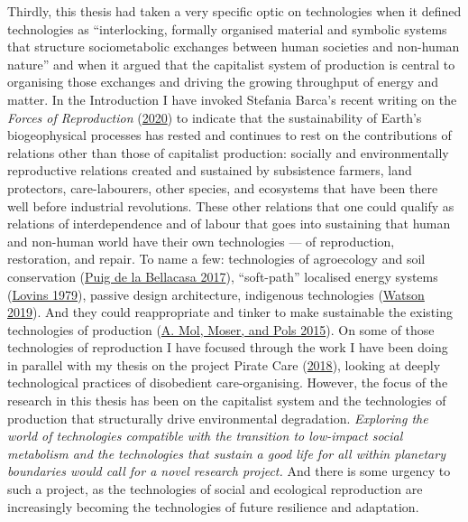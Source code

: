 \documentclass[a4paper, nobind]{templates/ociamthesis}
\begin{document}
Thirdly, this thesis had taken a very specific optic on technologies when it defined technologies as ``interlocking, formally organised material and symbolic systems that structure sociometabolic exchanges between human societies and non-human nature'' and when it argued that the capitalist system of production is central to organising those exchanges and driving the growing throughput of energy and matter. In the Introduction I have invoked Stefania Barca's recent writing on the \emph{Forces of Reproduction} (\protect\hyperlink{ref-barca_forces_2020}{2020}) to indicate that the sustainability of Earth's biogeophysical processes has rested and continues to rest on the contributions of relations other than those of capitalist production: socially and environmentally reproductive relations created and sustained by subsistence farmers, land protectors, care-labourers, other species, and ecosystems that have been there well before industrial revolutions. These other relations that one could qualify as relations of interdependence and of labour that goes into sustaining that human and non-human world have their own technologies --- of reproduction, restoration, and repair. To name a few: technologies of agroecology and soil conservation (\protect\hyperlink{ref-puig_de_la_bellacasa_matters_2017}{Puig de la Bellacasa 2017}), ``soft-path'' localised energy systems (\protect\hyperlink{ref-lovins_soft_1979}{Lovins 1979}), passive design architecture, indigenous technologies (\protect\hyperlink{ref-watson_lo-tek_2019}{Watson 2019}). And they could reappropriate and tinker to make sustainable the existing technologies of production (\protect\hyperlink{ref-mol_care_2015}{A. Mol, Moser, and Pols 2015}). On some of those technologies of reproduction I have focused through the work I have been doing in parallel with my thesis on the project Pirate Care (\protect\hyperlink{ref-pirate_care_network_piratecare_2018}{2018}), looking at deeply technological practices of disobedient care-organising. However, the focus of the research in this thesis has been on the capitalist system and the technologies of production that structurally drive environmental degradation. \emph{Exploring the world of technologies compatible with the transition to low-impact social metabolism and the technologies that sustain a good life for all within planetary boundaries would call for a novel research project.} And there is some urgency to such a project, as the technologies of social and ecological reproduction are increasingly becoming the technologies of future resilience and adaptation.
\end{document}
